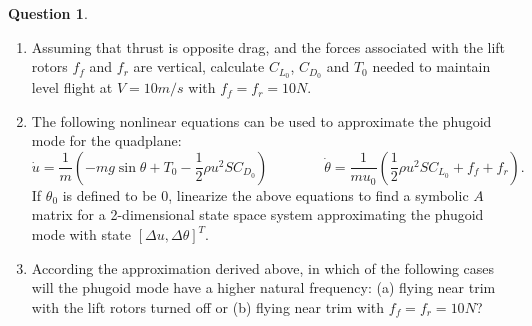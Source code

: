 \documentclass{article}
\theoremstyle{definition}
\newtheorem{question}{Question}
\begin{document}
\begin{question}
\begin{enumerate}[label=\alph*)]
    \item Assuming that thrust is opposite drag, and the forces associated with the lift rotors $f_f$ and $f_r$ are vertical,
        calculate $C_{L_0}$, $C_{D_0}$ and $T_0$ needed to maintain level flight at $V = 10 m/s$ with $f_f = f_r = 10N$.

    \item The following nonlinear equations can be used to approximate the phugoid mode for the quadplane:
        $$\dot{u} = \frac{1}{m}\left(-m g \sin \theta + T_0 - \frac{1}{2} \rho u^2 S C_{D_0}\right) \qquad \qquad \dot{\theta} = \frac{1}{m u_0} \left(\frac{1}{2} \rho u^2 S C_{L_0} + f_f + f_r\right) \text{.}$$
        If $\theta_0$ is defined to be $0$, linearize the above equations to find a symbolic $A$ matrix for a 2-dimensional state space system approximating the phugoid mode with state $[\Delta u, \Delta \theta]^T$.

    \item According the approximation derived above, in which of the following cases will the phugoid mode have a higher natural frequency: (a) flying near trim with the lift rotors turned off or (b) flying near trim with $f_f = f_r = 10N$?


\end{enumerate}
\end{question}
\end{document}
